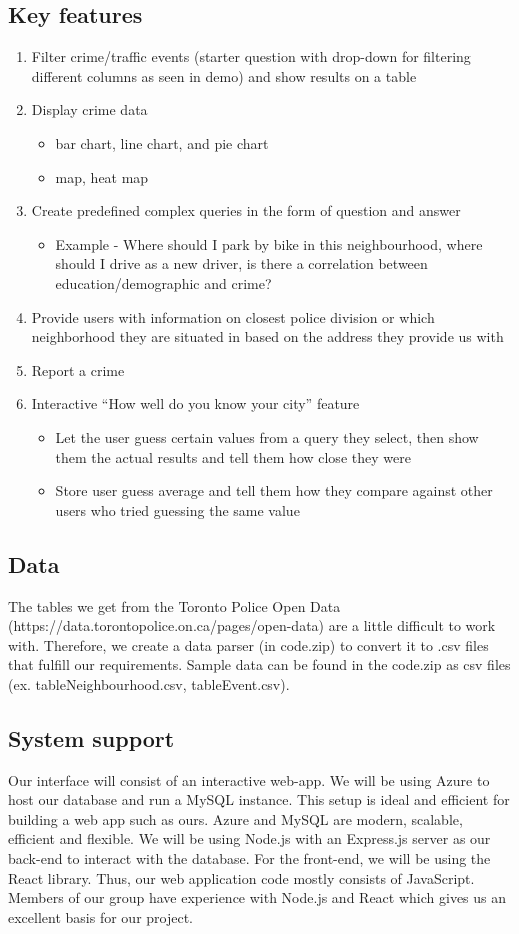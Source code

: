 \documentclass[12pt, a4paper]{article}
\begin{document}
\subsection*{Key features}
\begin{enumerate}
\item Filter crime/traffic events (starter question with drop-down for filtering different columns as seen in demo) and show results on a table
\item Display crime data
\begin{itemize}
\item bar chart, line chart, and pie chart
\item map, heat map
\end{itemize}
\item Create predefined complex queries in the form of question and answer
\begin{itemize}
    \item Example - Where should I park by bike in this neighbourhood, where should I drive as a new driver, is there a correlation between education/demographic and crime?
\end{itemize}
\item Provide users with information on closest police division or which neighborhood they are situated in based on the address they provide us with
\item Report a crime
\item Interactive “How well do you know your city” feature
\begin{itemize}
    \item Let the user guess certain values from a query they select, then show them the actual results and tell them how close they were
    \item Store user guess average and tell them how they compare against other users who tried guessing the same value
\end{itemize}
\end{enumerate}
\subsection*{Data}
The tables we get from the Toronto Police Open Data (https://data.torontopolice.on.ca/pages/open-data) are a little difficult to work with. Therefore, we create a data parser (in code.zip) to convert it to .csv files that fulfill our requirements. Sample data can be found in the code.zip as csv files (ex. tableNeighbourhood.csv, tableEvent.csv).
\subsection*{System support}
Our interface will consist of an interactive web-app. We will be using Azure to host our database and run a MySQL instance. This setup is ideal and efficient for building a web app such as ours. Azure and MySQL are modern, scalable, efficient and flexible. We will be using Node.js with an Express.js server as our back-end to interact with the database. For the front-end, we will be using the React library. Thus, our web application code mostly consists of JavaScript. Members of our group have experience with Node.js and React which gives us an excellent basis for our project.
\end{document}
